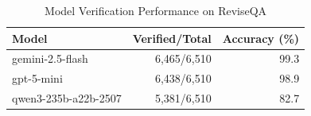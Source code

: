 \begin{table}[t]
\centering
\caption{Model Verification Performance on ReviseQA}
\label{tab:model_performance}
\begin{tabular}{lrr}
\toprule
\textbf{Model} & \textbf{Verified/Total} & \textbf{Accuracy (\%)} \\
\midrule
gemini-2.5-flash & 6,465/6,510 & 99.3 \\
gpt-5-mini & 6,438/6,510 & 98.9 \\
qwen3-235b-a22b-2507 & 5,381/6,510 & 82.7 \\
\bottomrule
\end{tabular}
\end{table}
